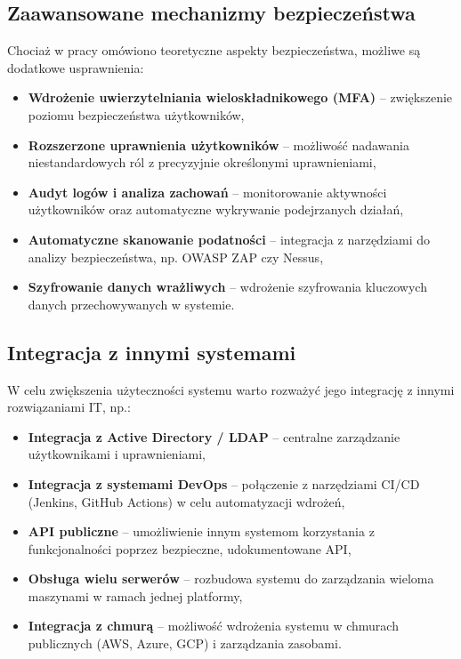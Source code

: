 \subsection{Zaawansowane mechanizmy bezpieczeństwa}
Chociaż w pracy omówiono teoretyczne aspekty bezpieczeństwa, możliwe są dodatkowe usprawnienia:
\begin{itemize}
    \item \textbf{Wdrożenie uwierzytelniania wieloskładnikowego (MFA)} – zwiększenie poziomu bezpieczeństwa użytkowników,
    \item \textbf{Rozszerzone uprawnienia użytkowników} – możliwość nadawania niestandardowych ról z precyzyjnie określonymi uprawnieniami,
    \item \textbf{Audyt logów i analiza zachowań} – monitorowanie aktywności użytkowników oraz automatyczne wykrywanie podejrzanych działań,
    \item \textbf{Automatyczne skanowanie podatności} – integracja z narzędziami do analizy bezpieczeństwa, np. OWASP ZAP czy Nessus,
    \item \textbf{Szyfrowanie danych wrażliwych} – wdrożenie szyfrowania kluczowych danych przechowywanych w systemie.
\end{itemize}

\subsection{Integracja z innymi systemami}
W celu zwiększenia użyteczności systemu warto rozważyć jego integrację z innymi rozwiązaniami IT, np.:
\begin{itemize}
    \item \textbf{Integracja z Active Directory / LDAP} – centralne zarządzanie użytkownikami i uprawnieniami,
    \item \textbf{Integracja z systemami DevOps} – połączenie z narzędziami CI/CD (Jenkins, GitHub Actions) w celu automatyzacji wdrożeń,
    \item \textbf{API publiczne} – umożliwienie innym systemom korzystania z funkcjonalności poprzez bezpieczne, udokumentowane API,
    \item \textbf{Obsługa wielu serwerów} – rozbudowa systemu do zarządzania wieloma maszynami w ramach jednej platformy,
    \item \textbf{Integracja z chmurą} – możliwość wdrożenia systemu w chmurach publicznych (AWS, Azure, GCP) i zarządzania zasobami.
\end{itemize}

